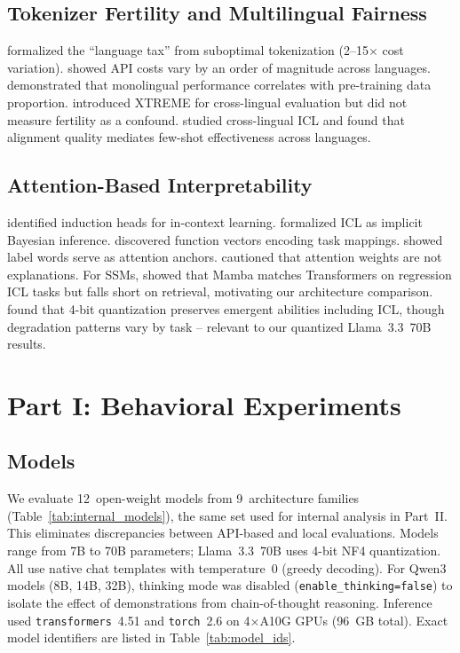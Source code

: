 \documentclass[11pt,a4paper]{article}
\begin{document}
\subsection{Tokenizer Fertility and Multilingual Fairness}

\citet{petrov2023language} formalized the ``language tax'' from suboptimal tokenization (2--15$\times$ cost variation). \citet{ahia2023all} showed API costs vary by an order of magnitude across languages. \citet{rust2021good} demonstrated that monolingual performance correlates with pre-training data proportion. \citet{hu2020xtreme} introduced XTREME for cross-lingual evaluation but did not measure fertility as a confound. \citet{tanwar2023multilingual} studied cross-lingual ICL and found that alignment quality mediates few-shot effectiveness across languages.

\subsection{Attention-Based Interpretability}

\citet{olsson2022context} identified induction heads for in-context learning. \citet{dai2023gpt} formalized ICL as implicit Bayesian inference. \citet{todd2024function} discovered function vectors encoding task mappings. \citet{wang2023label} showed label words serve as attention anchors. \citet{jain2019attention} cautioned that attention weights are not explanations. For SSMs, \citet{park2024mamba} showed that Mamba matches Transformers on regression ICL tasks but falls short on retrieval, motivating our architecture comparison. \citet{liu2024quantized} found that 4-bit quantization preserves emergent abilities including ICL, though degradation patterns vary by task -- relevant to our quantized Llama~3.3~70B results.

\section{Part I: Behavioral Experiments}
\label{sec:behavioral_methods}

\subsection{Models}

We evaluate 12~open-weight models from 9~architecture families (Table~\ref{tab:internal_models}), the same set used for internal analysis in Part~II. This eliminates discrepancies between API-based and local evaluations. Models range from 7B to 70B parameters; Llama~3.3~70B uses 4-bit NF4 quantization. All use native chat templates with temperature~0 (greedy decoding). For Qwen3 models (8B, 14B, 32B), thinking mode was disabled (\texttt{enable\_thinking=false}) to isolate the effect of demonstrations from chain-of-thought reasoning. Inference used \texttt{transformers}~4.51 and \texttt{torch}~2.6 on 4$\times$A10G GPUs (96~GB total). Exact model identifiers are listed in Table~\ref{tab:model_ids}.
\end{document}
